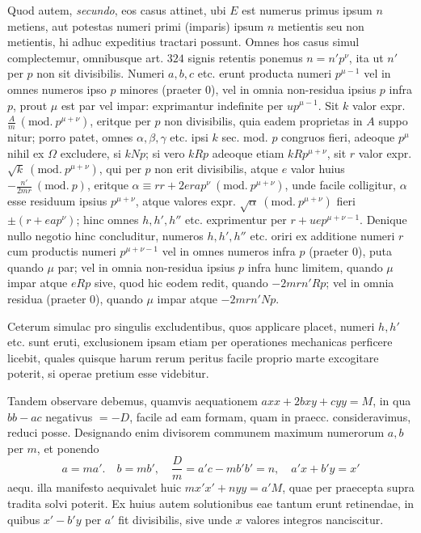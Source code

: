Quod autem, \textit{secundo}, eos casus attinet, ubi \(E\) est numerus primus ipsum \(n\) metiens, aut potestas numeri primi (imparis) ipsum \(n\) metientis seu non metientis, hi adhuc expeditius tractari possunt. Omnes hos casus simul complectemur, omnibusque art. \(324\) signis retentis ponemus \(n=n'p^\nu\), ita ut \(n'\) per \(p\) non sit divisibilis. Numeri \(a,\allowbreak b,\allowbreak c\) etc. erunt producta numeri \(p^{\mu-1}\) vel in omnes numeros ipso \(p\) minores (praeter \(0\)), vel in omnia non-residua ipsius \(p\) infra \(p\), prout \(\mu\) est par vel impar: exprimantur indefinite per \(up^{\mu-1}\). Sit \(k\) valor expr. \(\frac Am\ (\mathrm{mod.}\ p^{\mu+\nu})\), eritque per \(p\) non divisibilis, quia eadem proprietas in \(A\) suppo%
nitur; porro patet, omnes \(\alpha,\allowbreak \beta,\allowbreak \gamma\) etc. ipsi \(k\) sec. mod. \(p\) congruos fieri, adeoque \(p^\mu\) nihil ex \(\Omega\) excludere, si \(kNp\); si vero \(kRp\) adeoque etiam \(kRp^{\mu+\nu}\), sit \(r\) valor expr. \(\surd k\ (\mathrm{mod.}\ p^{\mu+\nu})\), qui per \(p\) non erit divisibilis, atque \(e\) valor huius \(-\frac{n'}{2mr}\ (\mathrm{mod.}\ p)\), eritque \(\alpha\equiv rr+2era p^\nu\ (\mathrm{mod.}\ p^{\mu+\nu})\), unde facile colligitur, \(\alpha\) esse residuum ipsius \(p^{\mu+\nu}\), atque valores expr. \(\surd\alpha\ (\mathrm{mod.}\ p^{\mu+\nu})\) fieri \(\pm(r+ea p^\nu)\); hinc omnes \(h,\allowbreak h',\allowbreak h''\) etc. exprimentur per \(r+uep^{\mu+\nu-1}\). Denique nullo negotio hinc concluditur, numeros \(h,\allowbreak h',\allowbreak h''\) etc. oriri ex additione numeri \(r\) cum productis numeri \(p^{\mu+\nu-1}\) vel in omnes numeros infra \(p\) (praeter \(0\)), puta quando \(\mu\) par; vel in omnia non-residua ipsius \(p\) infra hunc limitem, quando \(\mu\) impar atque \(eRp\) sive, quod hic eodem redit, quando \(-2mrn'Rp\); vel in omnia residua (praeter \(0\)), quando \(\mu\) impar atque \(-2mrn'Np\).

Ceterum simulac pro singulis excludentibus, quos applicare placet, numeri \(h,\allowbreak h'\) etc. sunt eruti, exclusionem ipsam etiam per operationes mechanicas perficere licebit, quales quisque harum rerum peritus facile proprio marte excogitare poterit, si operae pretium esse videbitur.

Tandem observare debemus, quamvis aequationem \(axx+2bxy+cyy=M\), in qua \(bb-ac\) negativus \(=-D\), facile ad eam formam, quam in praecc. consideravimus, reduci posse. Designando enim divisorem communem maximum numerorum \(a,\allowbreak b\) per \(m\), et ponendo \[ a=ma'.\quad b=mb',\quad \frac Dm=a'c-mb'b'=n,\quad a'x+b'y=x' \] aequ. illa manifesto aequivalet huic \(mx'x'+nyy=a'M\), quae per praecepta supra tradita solvi poterit. Ex huius autem solutionibus eae tantum erunt retinendae, in quibus \(x'-b'y\) per \(a'\) fit divisibilis, sive unde \(x\) valores integros nanciscitur.

